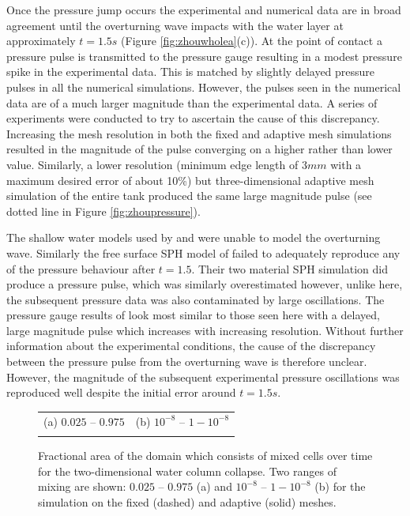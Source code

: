 Once the pressure jump occurs the experimental and numerical data are in broad agreement until the overturning wave impacts with the water layer at approximately $t=1.5s$ (Figure \ref{fig:zhouwholea}(c)).  At the point of contact a pressure pulse is transmitted to the pressure gauge resulting in a modest pressure spike in the experimental data.  This is matched by slightly delayed pressure pulses in all the numerical simulations.  However, the pulses seen in the numerical data are of a much larger magnitude than the experimental data.  A series of experiments were conducted to try to ascertain the cause of this discrepancy.  Increasing the mesh resolution in both the fixed and adaptive mesh simulations resulted in the magnitude of the pulse converging on a higher rather than lower value.  Similarly, a lower resolution (minimum edge length of $3mm$ with a maximum desired error of about 10\%) but three-dimensional adaptive mesh simulation of the entire tank produced the same large magnitude pulse (see dotted line in Figure \ref{fig:zhoupressure}).

The shallow water models used by \citet{zhou_nonlinear_1999} and \citet{lee_numerical_2002} were unable to model the overturning wave.  Similarly the free surface SPH model of \citet{colagrossi_numerical_2003} failed to adequately reproduce any of the pressure behaviour after $t=1.5$.  Their two material SPH simulation did produce a pressure pulse, which was similarly overestimated however, unlike here, the subsequent pressure data was also contaminated by large oscillations.  The pressure gauge results of \citet{park_volume-of-fluid_2009} look most similar to those seen here with a delayed, large magnitude pulse which increases with increasing resolution.  Without further information about the experimental conditions, the cause of the discrepancy between the pressure pulse from the overturning wave is therefore unclear.  However, the magnitude of the subsequent experimental pressure oscillations was reproduced well despite the initial error around $t=1.5s$.

\begin{figure}[tbp]
\begin{center}
\begin{tabular}{ll}
(a) $0.025$ -- $0.975$ & (b) $10^{-8}$ -- $1-10^{-8}$  \\
 & \\
\end{tabular}
\caption{Fractional area of the domain which consists of mixed cells over time for the two-dimensional water column collapse.  Two ranges of mixing are shown: $0.025$ -- $0.975$ (a) and $10^{-8}$ -- $1-10^{-8}$ (b) for the simulation on the fixed (dashed) and adaptive (solid) meshes.}
\label{fig:zhoumixing}
\end{center}
\end{figure}

